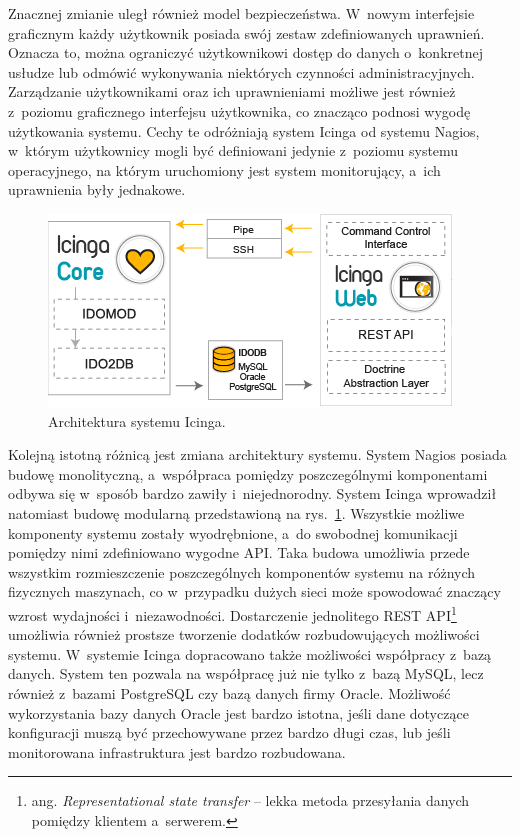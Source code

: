 Znacznej zmianie uległ również model bezpieczeństwa. W~nowym
interfejsie graficznym każdy użytkownik posiada swój zestaw
zdefiniowanych uprawnień. Oznacza to, można ograniczyć użytkownikowi
dostęp do danych o~konkretnej usłudze lub odmówić wykonywania
niektórych czynności administracyjnych. Zarządzanie użytkownikami oraz
ich uprawnieniami możliwe jest również z~poziomu graficznego
interfejsu użytkownika, co znacząco podnosi wygodę użytkowania
systemu. Cechy te odróżniają system Icinga od systemu Nagios, w~którym
użytkownicy mogli być definiowani jedynie z~poziomu systemu
operacyjnego, na którym uruchomiony jest system monitorujący, a~ich
uprawnienia były jednakowe.

\begin{figure}[ht]
  \caption{Architektura systemu Icinga.}
  \label{fig:IcingaOverview}
  \centering
\includegraphics{img/icingaOverview.png}
\end{figure}

Kolejną istotną różnicą jest zmiana architektury systemu. System
Nagios posiada budowę monolityczną, a~współpraca pomiędzy
poszczególnymi komponentami odbywa się w~sposób bardzo zawiły
i~niejednorodny. System Icinga wprowadził natomiast budowę modularną
przedstawioną na rys.~\ref{fig:IcingaOverview}.  Wszystkie możliwe
komponenty systemu zostały wyodrębnione, a~do swobodnej komunikacji
pomiędzy nimi zdefiniowano wygodne API. Taka budowa umożliwia przede
wszystkim rozmieszczenie poszczególnych komponentów systemu na różnych
fizycznych maszynach, co w~przypadku dużych sieci może spowodować
znaczący wzrost wydajności i~niezawodności. Dostarczenie jednolitego
REST API\footnote{ang. {\em Representational state transfer} -- lekka
  metoda przesyłania danych pomiędzy klientem a~serwerem.} umożliwia
również prostsze tworzenie dodatków rozbudowujących możliwości
systemu.  W~systemie Icinga dopracowano także możliwości współpracy
z~bazą danych. System ten pozwala na współpracę już nie tylko z~bazą
MySQL, lecz również z~bazami PostgreSQL czy bazą danych firmy
Oracle. Możliwość wykorzystania bazy danych Oracle jest bardzo
istotna, jeśli dane dotyczące konfiguracji muszą być przechowywane
przez bardzo długi czas, lub jeśli monitorowana infrastruktura jest
bardzo rozbudowana.

